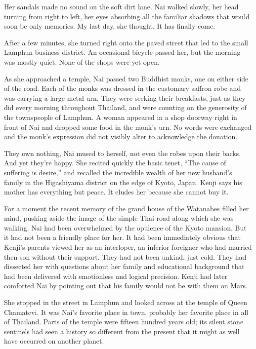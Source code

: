 \documentclass[]{article}
\begin{document}
{Her sandals made no sound on the soft dirt lane. Nai walked slowly, her head turning from right to left, her eyes absorbing all the familiar shadows that would soon be only memories. My last day, she thought. It has finally come.

After a few minutes, she turned right onto the paved street that led to the small Lamphun business district. An occasional bicycle passed her, but the morning was mostly quiet. None of the shops were yet open.

As she approached a temple, Nai passed two Buddhist monks, one on either side of the road. Each of the monks was dressed in the customary saffron robe and was carrying a large metal urn. They were seeking their breakfasts, just as they did every morning throughout Thailand, and were counting on the generosity of the townspeople of Lamphun. A woman appeared in a shop doorway right in front of Nai and dropped some food in the monk’s urn. No words were exchanged and the monk’s expression did not visibly alter to acknowledge the donation.

They own nothing, Nai mused to herself, not even the robes upon their backs. And yet they’re happy. She recited quickly the basic tenet, “The cause of suffering is desire,” and recalled the incredible wealth of her new husband’s family in the Higashiyama district on the edge of Kyoto, Japan. Kenji says his mother has everything but peace. It eludes her because she cannot buy it.

For a moment the recent memory of the grand house of the Watanabes filled her mind, pushing aside the image of the simple Thai road along which she was walking. Nai had been overwhelmed by the opulence of the Kyoto mansion. But it had not been a friendly place for her. It had been immediately obvious that Kenji’s parents viewed her as an interloper, an inferior foreigner who had married then-son without their support. They had not been unkind, just cold. They had dissected her with questions about her family and educational background that had been delivered with emotionless and logical precision. Kenji had later comforted Nai by pointing out that his family would not be with them on Mars.

She stopped in the street in Lamphun and looked across at the temple of Queen Chamatevi. It was Nai’s favorite place in town, probably her favorite place in all of Thailand. Parts of the temple were fifteen hundred years old; its silent stone sentinels had seen a history so different from the present that it might as well have occurred on another planet.

}
\end{document}

